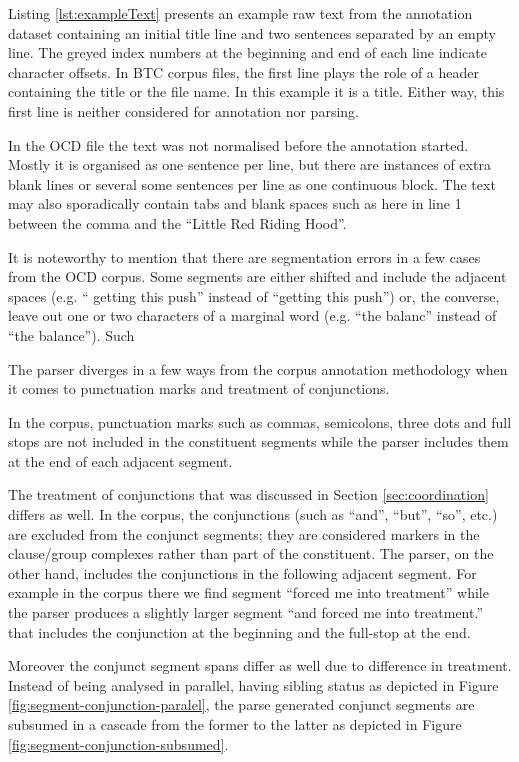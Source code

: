     Listing \ref{lst:exampleText} presents an example raw text from the annotation dataset containing an initial title line and two sentences separated by an empty line. The greyed index numbers at the beginning and end of each line indicate character offsets. In BTC corpus files, the first line plays the role of a header containing the title or the file name. In this example it is a title. Either way, this first line is neither considered for annotation nor parsing. 
    
    In the OCD file the text was not normalised before the annotation started. Mostly it is organised as one sentence per line, but there are instances of  extra blank lines or several some sentences per line as one continuous block. The text may also sporadically contain tabs and blank spaces such as here in line 1 between the comma and the ``Little Red Riding Hood''. 

    It is noteworthy to mention that there are segmentation errors in a few cases from the OCD corpus. Some segments are either shifted and include the adjacent spaces (e.g. `` getting this push'' instead of ``getting this push'') or, the converse, leave out one or two characters of a marginal word (e.g. ``the balanc'' instead of ``the balance''). Such 

    The parser diverges in a few ways from the corpus annotation methodology when it comes to punctuation marks and treatment of conjunctions. 
    
    In the corpus, punctuation marks such as commas, semicolons, three dots and full stops are not included in the constituent segments while the parser includes them at the end of each adjacent segment. 
    
    The treatment of conjunctions that was discussed in Section \ref{sec:coordination} differs as well. In the corpus, the conjunctions (such as ``and'', ``but'', ``so'', etc.) are excluded from the conjunct segments; they are considered markers in the clause/group complexes rather than part of the constituent. The parser, on the other hand, includes the conjunctions in the following adjacent segment. For example in the corpus there we find segment ``forced me into treatment'' while the parser produces a slightly larger segment ``and forced me into treatment.'' that includes the conjunction at the beginning and the full-stop at the end.
    
    Moreover the conjunct segment spans differ as well due to difference in treatment. Instead of being analysed in parallel, having sibling status as depicted in Figure \ref{fig:segment-conjunction-paralel}, the parse generated conjunct segments are subsumed in a cascade from the former to the latter as depicted in Figure \ref{fig:segment-conjunction-subsumed}.

